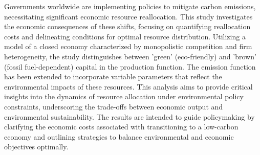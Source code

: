 Governments worldwide are implementing policies to mitigate carbon emissions, necessitating significant economic resource reallocation. This study investigates the economic consequences of these shifts, focusing on quantifying reallocation costs and delineating conditions for optimal resource distribution. Utilizing a model of a closed economy characterized by monopolistic competition and firm heterogeneity, the study distinguishes between 'green' (eco-friendly) and 'brown' (fossil fuel-dependent) capital in the production function. The emission function has been extended to incorporate variable parameters that reflect the environmental impacts of these resources. This analysis aims to provide critical insights into the dynamics of resource allocation under environmental policy constraints, underscoring the trade-offs between economic output and environmental sustainability. The results are intended to guide policymaking by clarifying the economic costs associated with transitioning to a low-carbon economy and outlining strategies to balance environmental and economic objectives optimally.